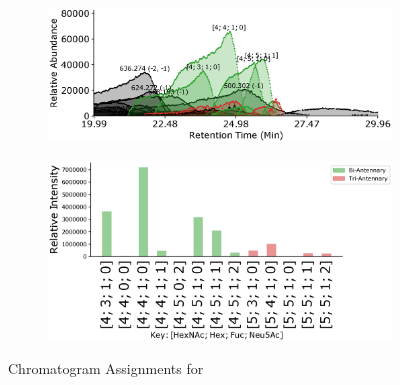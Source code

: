     \begin{figure}[htb]
        \centering
        \begin{minipage}{1\linewidth}
            \centering
            \begin{subfigure}[b]{0.49\linewidth}
                \includegraphics[width=1\linewidth, valign=t]{figure/native_igg_chromatograms.eps}
                \subcaption{
                    \label{fig:igg_assignment:a}
                }
            \end{subfigure}
            \vspace{0pt}
            \begin{subfigure}[b]{0.49\linewidth}
                \includegraphics[width=1\linewidth, valign=b]{figure/native_igg_abundances.eps}
                \subcaption{
                    \label{fig:igg_assignment:b}
                }
            \end{subfigure}
        \end{minipage}
        \caption{Chromatogram Assignments for \igg
            \label{fig:igg_assignments}
        }
    \end{figure}
